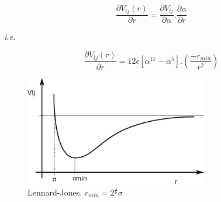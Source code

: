 \documentclass{article}
\begin{document}
\begin{equation}
  \label{eq:derivative}
  \frac{\partial V_{\mathit{lj}}(r)}{\partial r} = \frac{\partial V_{\mathit{lj}}}{\partial \alpha} . \frac{\partial \alpha}{\partial r}
\end{equation}

\emph{i.e.}

\begin{equation}
  \label{eq:derivative}
  \frac{\partial V_{\mathit{lj}}(r)}{\partial r} = 12 \epsilon \left[ \alpha^{\mathit{11}} - \alpha^{5} \right] . \left( \frac{-r_{\mathit{min}}}{r^2} \right)
\end{equation}


\begin{figure}
  \centering
  \includegraphics[width=8cm]{lennard-jones.png}
  \caption{Lennard-Jones.  $r_{\mathit{min}} = 2^{\frac{1}{6}} \sigma$}
  \label{fig:lennard-jones}
\end{figure}
\end{document}
